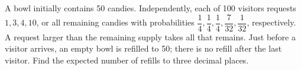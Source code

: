 A bowl initially contains 50 candies. Independently, each of 100 visitors requests $1,3,4,10$, or all remaining candies with probabilities $\dfrac{1}{4},\dfrac{1}{4},\dfrac{1}{4},\dfrac{7}{32},\dfrac{1}{32}$, respectively. A request larger than the remaining supply takes all that remains. Just before a visitor arrives, an empty bowl is refilled to 50; there is no refill after the last visitor. Find the expected number of refills to three decimal places.
